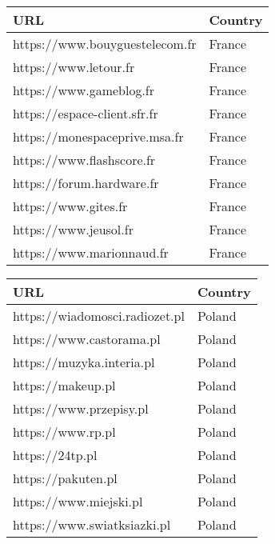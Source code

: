 \begin{center}
\begin{tabular}{ll}
	\toprule
	URL   & Country        \\
	\midrule
    https://www.bouyguestelecom.fr & France \\
    https://www.letour.fr & France \\
    https://www.gameblog.fr & France \\
    https://espace-client.sfr.fr & France \\
    https://monespaceprive.msa.fr & France \\
    https://www.flashscore.fr & France \\
    https://forum.hardware.fr & France \\
    https://www.gites.fr & France \\
    https://www.jeusol.fr & France \\
    https://www.marionnaud.fr & France \\
	\bottomrule
\end{tabular}
\end{center}

\begin{center}
\begin{tabular}{ll}
	\toprule
	URL   & Country        \\
	\midrule
    https://wiadomosci.radiozet.pl & Poland \\
    https://www.castorama.pl & Poland \\
    https://muzyka.interia.pl & Poland \\
    https://makeup.pl & Poland \\
    https://www.przepisy.pl & Poland \\
    https://www.rp.pl & Poland \\
    https://24tp.pl & Poland \\
    https://pakuten.pl & Poland \\
    https://www.miejski.pl & Poland \\
    https://www.swiatksiazki.pl & Poland \\
    \bottomrule
\end{tabular}
\end{center}

